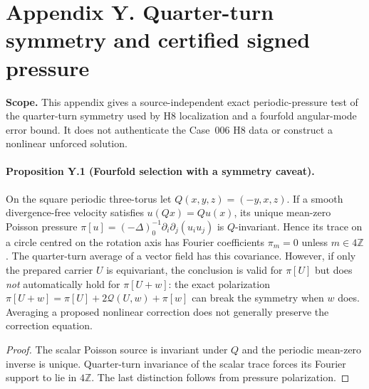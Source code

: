 \clearpage
\section*{Appendix Y. Quarter-turn symmetry and certified signed pressure}
\noindent\textbf{Scope.} This appendix gives a source-independent exact periodic-pressure test of the quarter-turn symmetry used by H8 localization and a fourfold angular-mode error bound. It does not authenticate the Case~006 H8 data or construct a nonlinear unforced solution.

\paragraph{Proposition Y.1 (Fourfold selection with a symmetry caveat).}
On the square periodic three-torus let $Q(x,y,z)=(-y,x,z)$. If a smooth divergence-free velocity satisfies $u(Qx)=Qu(x)$, its unique mean-zero Poisson pressure
$\pi[u]=(-\Delta)^{-1}_0\partial_i\partial_j(u_i u_j)$ is $Q$-invariant. Hence its trace on a circle centred on the rotation axis has Fourier coefficients $\pi_m=0$ unless $m\in4\mathbb Z$. The quarter-turn average of a vector field has this covariance. However, if only the prepared carrier $U$ is equivariant, the conclusion is valid for $\pi[U]$ but does \emph{not} automatically hold for $\pi[U+w]$: the exact polarization
$\pi[U+w]=\pi[U]+2\mathcal Q(U,w)+\pi[w]$ can break the symmetry when $w$ does. Averaging a proposed nonlinear correction does not generally preserve the correction equation.
\begin{proof}
The scalar Poisson source is invariant under $Q$ and the periodic mean-zero inverse is unique. Quarter-turn invariance of the scalar trace forces its Fourier support to lie in $4\mathbb Z$. The last distinction follows from pressure polarization.
\end{proof}

